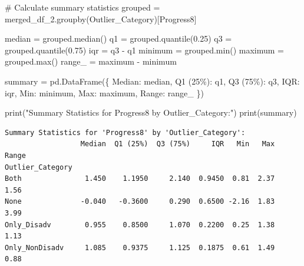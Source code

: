 \documentclass[
  letterpaper,
  DIV=11,
  numbers=noendperiod]{scrartcl}
\newenvironment{Shaded}{\begin{snugshade}}{\end{snugshade}}
\newcommand{\BuiltInTok}[1]{\textcolor[rgb]{0.00,0.23,0.31}{#1}}
\newcommand{\CommentTok}[1]{\textcolor[rgb]{0.37,0.37,0.37}{#1}}
\newcommand{\FloatTok}[1]{\textcolor[rgb]{0.68,0.00,0.00}{#1}}
\newcommand{\NormalTok}[1]{\textcolor[rgb]{0.00,0.23,0.31}{#1}}
\newcommand{\OperatorTok}[1]{\textcolor[rgb]{0.37,0.37,0.37}{#1}}
\newcommand{\StringTok}[1]{\textcolor[rgb]{0.13,0.47,0.30}{#1}}
\begin{document}
\begin{Shaded}
\begin{Highlighting}[]
\CommentTok{\# Calculate summary statistics}
\NormalTok{grouped }\OperatorTok{=}\NormalTok{ merged\_df\_2.groupby(}\StringTok{\textquotesingle{}Outlier\_Category\textquotesingle{}}\NormalTok{)[}\StringTok{\textquotesingle{}Progress8\textquotesingle{}}\NormalTok{]}


\NormalTok{median }\OperatorTok{=}\NormalTok{ grouped.median()}
\NormalTok{q1 }\OperatorTok{=}\NormalTok{ grouped.quantile(}\FloatTok{0.25}\NormalTok{)}
\NormalTok{q3 }\OperatorTok{=}\NormalTok{ grouped.quantile(}\FloatTok{0.75}\NormalTok{)}
\NormalTok{iqr }\OperatorTok{=}\NormalTok{ q3 }\OperatorTok{{-}}\NormalTok{ q1}
\NormalTok{minimum }\OperatorTok{=}\NormalTok{ grouped.}\BuiltInTok{min}\NormalTok{()}
\NormalTok{maximum }\OperatorTok{=}\NormalTok{ grouped.}\BuiltInTok{max}\NormalTok{()}
\NormalTok{range\_ }\OperatorTok{=}\NormalTok{ maximum }\OperatorTok{{-}}\NormalTok{ minimum}


\NormalTok{summary }\OperatorTok{=}\NormalTok{ pd.DataFrame(\{}
    \StringTok{\textquotesingle{}Median\textquotesingle{}}\NormalTok{: median,}
    \StringTok{\textquotesingle{}Q1 (25\%)\textquotesingle{}}\NormalTok{: q1,}
    \StringTok{\textquotesingle{}Q3 (75\%)\textquotesingle{}}\NormalTok{: q3,}
    \StringTok{\textquotesingle{}IQR\textquotesingle{}}\NormalTok{: iqr,}
    \StringTok{\textquotesingle{}Min\textquotesingle{}}\NormalTok{: minimum,}
    \StringTok{\textquotesingle{}Max\textquotesingle{}}\NormalTok{: maximum,}
    \StringTok{\textquotesingle{}Range\textquotesingle{}}\NormalTok{: range\_}
\NormalTok{\})}


\BuiltInTok{print}\NormalTok{(}\StringTok{"Summary Statistics for \textquotesingle{}Progress8\textquotesingle{} by \textquotesingle{}Outlier\_Category\textquotesingle{}:"}\NormalTok{)}
\BuiltInTok{print}\NormalTok{(summary)}
\end{Highlighting}
\end{Shaded}

\begin{verbatim}
Summary Statistics for 'Progress8' by 'Outlier_Category':
                  Median  Q1 (25%)  Q3 (75%)     IQR   Min   Max  Range
Outlier_Category                                                       
Both               1.450    1.1950     2.140  0.9450  0.81  2.37   1.56
None              -0.040   -0.3600     0.290  0.6500 -2.16  1.83   3.99
Only_Disadv        0.955    0.8500     1.070  0.2200  0.25  1.38   1.13
Only_NonDisadv     1.085    0.9375     1.125  0.1875  0.61  1.49   0.88
\end{verbatim}
\end{document}
